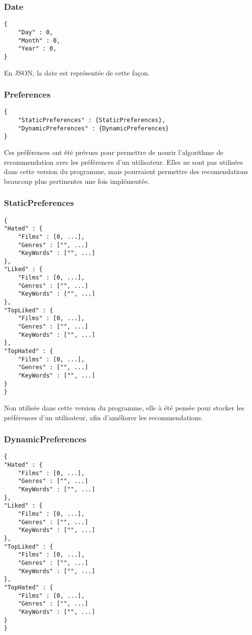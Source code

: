 \subsubsection{Date}
\begin{lstlisting}
{
	"Day" : 0,
	"Month" : 0,
	"Year" : 0,
}
\end{lstlisting}
En JSON, la date est représentée de cette façon.

\subsubsection{Preferences}

\begin{lstlisting}
{
	"StaticPreferences" : {StaticPreferences},
	"DynamicPreferences" : {DynamicPreferences}
}
\end{lstlisting}
Ces préférences ont été prévues pour permettre de nourir l'algorithme de recommendation avec les préférences d'un utilisateur.
Elles ne sont pas utilisées dans cette version du programme, mais pourraient permettre des recomendations beaucoup plus pertinentes une fois implémentée.


\subsubsection{StaticPreferences}

\begin{lstlisting}
{
"Hated" : {
	"Films" : [0, ...],
	"Genres" : ["", ...]
	"KeyWords" : ["", ...]
},
"Liked" : {
	"Films" : [0, ...],
	"Genres" : ["", ...]
	"KeyWords" : ["", ...]
},
"TopLiked" : {
	"Films" : [0, ...],
	"Genres" : ["", ...]
	"KeyWords" : ["", ...]
},
"TopHated" : {
	"Films" : [0, ...],
	"Genres" : ["", ...]
	"KeyWords" : ["", ...]
}
}
\end{lstlisting}
Non utilisée dans cette version du programme, elle à été pensée pour stocker les préférences d'un utilisateur, afin d'améliorer les recommendations.
\subsubsection{DynamicPreferences}

\begin{lstlisting}
{
"Hated" : {
	"Films" : [0, ...],
	"Genres" : ["", ...]
	"KeyWords" : ["", ...]
},
"Liked" : {
	"Films" : [0, ...],
	"Genres" : ["", ...]
	"KeyWords" : ["", ...]
},
"TopLiked" : {
	"Films" : [0, ...],
	"Genres" : ["", ...]
	"KeyWords" : ["", ...]
},
"TopHated" : {
	"Films" : [0, ...],
	"Genres" : ["", ...]
	"KeyWords" : ["", ...]
}
}
\end{lstlisting}

